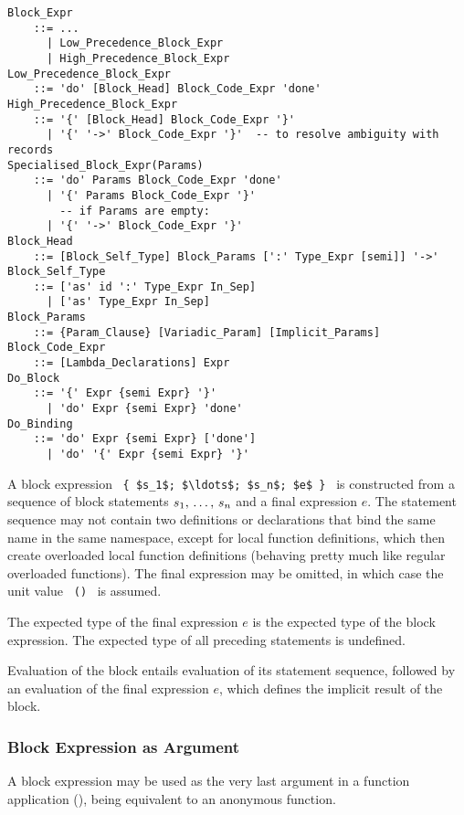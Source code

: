 \grammar\begin{lstlisting}
Block_Expr 
    ::= ...
      | Low_Precedence_Block_Expr
      | High_Precedence_Block_Expr
Low_Precedence_Block_Expr
    ::= 'do' [Block_Head] Block_Code_Expr 'done'
High_Precedence_Block_Expr
    ::= '{' [Block_Head] Block_Code_Expr '}'
      | '{' '->' Block_Code_Expr '}'  -- to resolve ambiguity with records
Specialised_Block_Expr(Params)
    ::= 'do' Params Block_Code_Expr 'done'
      | '{' Params Block_Code_Expr '}'
        -- if Params are empty:
      | '{' '->' Block_Code_Expr '}'
Block_Head
    ::= [Block_Self_Type] Block_Params [':' Type_Expr [semi]] '->'
Block_Self_Type
    ::= ['as' id ':' Type_Expr In_Sep]
      | ['as' Type_Expr In_Sep]
Block_Params
    ::= {Param_Clause} [Variadic_Param] [Implicit_Params]
Block_Code_Expr
    ::= [Lambda_Declarations] Expr
Do_Block 
    ::= '{' Expr {semi Expr} '}' 
      | 'do' Expr {semi Expr} 'done'
Do_Binding 
    ::= 'do' Expr {semi Expr} ['done']
      | 'do' '{' Expr {semi Expr} '}' 
\end{lstlisting}

A block expression ~\lstinline!{ $s_1$; $\ldots$; $s_n$; $e$ }!~ is constructed from a sequence of block statements $s_1 ,\, \ldots ,\, s_n$ and a final expression $e$. The statement sequence may not contain two definitions or declarations that bind the same name in the same namespace, except for local function definitions, which then create overloaded local function definitions (behaving pretty much like regular overloaded functions). The final expression may be omitted, in which case the unit value ~\lstinline!()!~ is assumed. 

The expected type of the final expression $e$ is the expected type of the block expression. The expected type of all preceding statements is undefined. 

Evaluation of the block entails evaluation of its statement sequence, followed by an evaluation of the final expression $e$, which defines the implicit result of the block. 





\subsubsection{Block Expression as Argument}
\label{sec:block-arguments}

A block expression may be used as the very last argument in a function application (), being equivalent to an anonymous function. 


